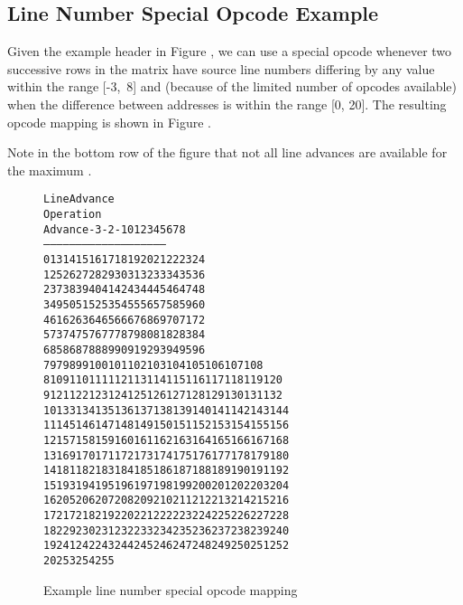 \subsection{Line Number Special Opcode Example}
\label{app:linenumberspecialopcodeexample}
\bb
Given the example header in Figure ,
\eb
we can use a special opcode whenever two successive rows in
the matrix have source line numbers differing by any value
within the range \mbox{[-3, 8]} and (because of the limited number
of opcodes available) when the difference between addresses
is within the range [0, 20].
The resulting opcode mapping is shown in
Figure .

Note in the bottom row of the figure that not all line advances are 
available for the maximum .

\begin{figure}[ht]
\begin{alltt}
                        Line Advance
   Operation  
     Advance    -3  -2  -1   0   1   2   3   4   5   6   7   8
   ---------   -----------------------------------------------
           0    13  14  15  16  17  18  19  20  21  22  23  24
           1    25  26  27  28  29  30  31  32  33  34  35  36
           2    37  38  39  40  41  42  43  44  45  46  47  48
           3    49  50  51  52  53  54  55  56  57  58  59  60
           4    61  62  63  64  65  66  67  68  69  70  71  72
           5    73  74  75  76  77  78  79  80  81  82  83  84
           6    85  86  87  88  89  90  91  92  93  94  95  96
           7    97  98  99 100 101 102 103 104 105 106 107 108
           8   109 110 111 112 113 114 115 116 117 118 119 120
           9   121 122 123 124 125 126 127 128 129 130 131 132
          10   133 134 135 136 137 138 139 140 141 142 143 144
          11   145 146 147 148 149 150 151 152 153 154 155 156
          12   157 158 159 160 161 162 163 164 165 166 167 168
          13   169 170 171 172 173 174 175 176 177 178 179 180
          14   181 182 183 184 185 186 187 188 189 190 191 192
          15   193 194 195 196 197 198 199 200 201 202 203 204
          16   205 206 207 208 209 210 211 212 213 214 215 216
          17   217 218 219 220 221 222 223 224 225 226 227 228 
          18   229 230 231 232 233 234 235 236 237 238 239 240 
          19   241 242 243 244 245 246 247 248 249 250 251 252
          20   253 254 255
          
\end{alltt}
\caption{Example line number special opcode mapping}
\label{fig:examplelinenumberspecialopcodemapping}
\end{figure}

